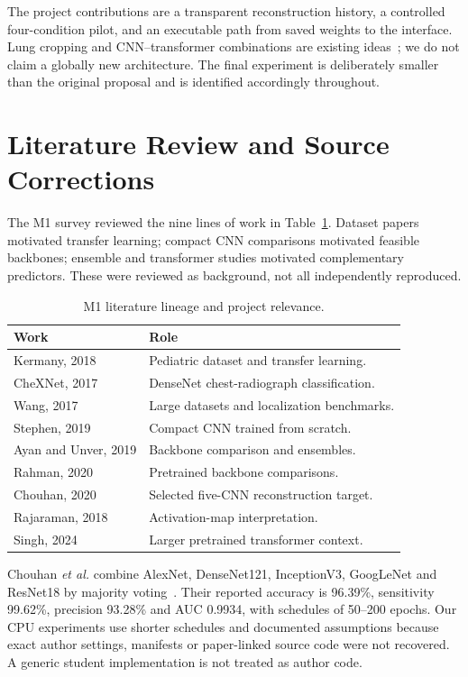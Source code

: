 \documentclass[conference]{IEEEtran}
\begin{document}
The project contributions are a transparent reconstruction history, a controlled four-condition pilot, and an executable path from saved weights to the interface. Lung cropping and CNN--transformer combinations are existing ideas~\cite{hybrid,deit}; we do not claim a globally new architecture. The final experiment is deliberately smaller than the original proposal and is identified accordingly throughout.

\section{Literature Review and Source Corrections}
The M1 survey reviewed the nine lines of work in Table~\ref{tab:lit}. Dataset papers motivated transfer learning; compact CNN comparisons motivated feasible backbones; ensemble and transformer studies motivated complementary predictors. These were reviewed as background, not all independently reproduced.
\begin{table}[!t]\caption{M1 literature lineage and project relevance.}\label{tab:lit}\centering\footnotesize\begin{tabularx}{\columnwidth}{@{}lX@{}}\toprule\rowcolor{RRlight}Work & Role\\\midrule
Kermany, 2018 & Pediatric dataset and transfer learning.\\
CheXNet, 2017 & DenseNet chest-radiograph classification.\\
Wang, 2017 & Large datasets and localization benchmarks.\\
Stephen, 2019 & Compact CNN trained from scratch.\\
Ayan and Unver, 2019 & Backbone comparison and ensembles.\\
Rahman, 2020 & Pretrained backbone comparisons.\\
Chouhan, 2020 & Selected five-CNN reconstruction target.\\
Rajaraman, 2018 & Activation-map interpretation.\\
Singh, 2024 & Larger pretrained transformer context.\\\bottomrule\end{tabularx}\end{table}

Chouhan \emph{et al.} combine AlexNet, DenseNet121, InceptionV3, GoogLeNet and ResNet18 by majority voting~\cite{chouhan}. Their reported accuracy is 96.39\%, sensitivity 99.62\%, precision 93.28\% and AUC 0.9934, with schedules of 50--200 epochs. Our CPU experiments use shorter schedules and documented assumptions because exact author settings, manifests or paper-linked source code were not recovered. A generic student implementation is not treated as author code.
\end{document}

